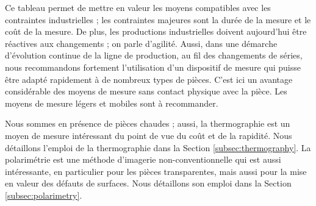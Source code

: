 Ce tableau permet de mettre en valeur les moyens compatibles avec les contraintes industrielles ; les contraintes majeures sont la durée de la mesure et le coût de la mesure.
De plus, les productions industrielles doivent aujourd'hui être réactives aux changements ; on parle d'agilité.
Aussi, dans une démarche d'évolution continue de la ligne de production, au fil des changements de séries, nous recommandons fortement l'utilisation d'un dispositif de mesure qui puisse être adapté rapidement à de nombreux types de pièces.
C'est ici un avantage considérable des moyens de mesure sans contact physique avec la pièce.
Les moyens de mesure légers et mobiles sont à recommander.

Nous sommes en présence de pièces chaudes ; aussi, la thermographie est un moyen de mesure intéressant du point de vue du coût et de la rapidité.
Nous détaillons l'emploi de la thermographie dans la Section \ref{subsec:thermography}.
La polarimétrie est une méthode d'imagerie non-conventionnelle qui est aussi intéressante, en particulier pour les pièces transparentes, mais aussi pour la mise en valeur des défauts de surfaces.
Nous détaillons son emploi dans la Section \ref{subsec:polarimetry}.

